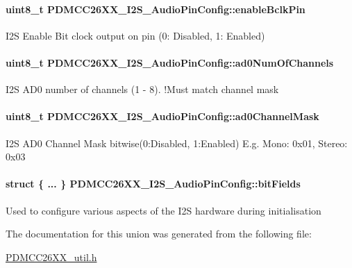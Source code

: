 \paragraph[{enable\+Bclk\+Pin}]{\setlength{\rightskip}{0pt plus 5cm}uint8\+\_\+t P\+D\+M\+C\+C26\+X\+X\+\_\+\+I2\+S\+\_\+\+Audio\+Pin\+Config\+::enable\+Bclk\+Pin}\label{union_p_d_m_c_c26_x_x___i2_s___audio_pin_config_a10fc32796844e7f1320cee642695237e}
I2\+S Enable Bit clock output on pin (0\+: Disabled, 1\+: Enabled) 
\paragraph[{ad0\+Num\+Of\+Channels}]{\setlength{\rightskip}{0pt plus 5cm}uint8\+\_\+t P\+D\+M\+C\+C26\+X\+X\+\_\+\+I2\+S\+\_\+\+Audio\+Pin\+Config\+::ad0\+Num\+Of\+Channels}\label{union_p_d_m_c_c26_x_x___i2_s___audio_pin_config_aefb4fcc1a8af0204f4daf2dd82b6498a}
I2\+S A\+D0 number of channels (1 -\/ 8). !\+Must match channel mask 
\paragraph[{ad0\+Channel\+Mask}]{\setlength{\rightskip}{0pt plus 5cm}uint8\+\_\+t P\+D\+M\+C\+C26\+X\+X\+\_\+\+I2\+S\+\_\+\+Audio\+Pin\+Config\+::ad0\+Channel\+Mask}\label{union_p_d_m_c_c26_x_x___i2_s___audio_pin_config_adfd6ad24574668b77d782c3616369c73}
I2\+S A\+D0 Channel Mask bitwise(0\+:\+Disabled, 1\+:\+Enabled) E.\+g. Mono\+: 0x01, Stereo\+: 0x03 
\paragraph[{bit\+Fields}]{\setlength{\rightskip}{0pt plus 5cm}struct \{ ... \}   P\+D\+M\+C\+C26\+X\+X\+\_\+\+I2\+S\+\_\+\+Audio\+Pin\+Config\+::bit\+Fields}\label{union_p_d_m_c_c26_x_x___i2_s___audio_pin_config_af7a937acd106d08504f69de6a0569aeb}
Used to configure various aspects of the I2\+S hardware during initialisation 

The documentation for this union was generated from the following file\+:\begin{DoxyCompactItemize}
\item 
\hyperlink{_p_d_m_c_c26_x_x__util_8h}{P\+D\+M\+C\+C26\+X\+X\+\_\+util.\+h}\end{DoxyCompactItemize}

